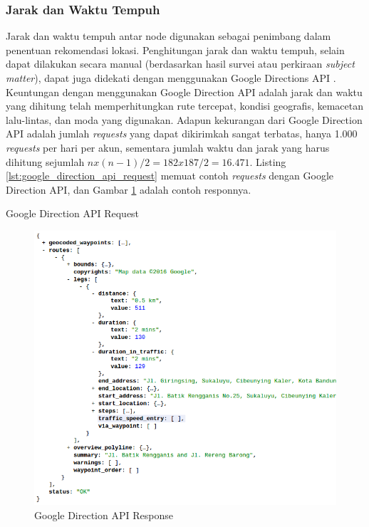 \subsubsection{Jarak dan Waktu Tempuh}

Jarak dan waktu tempuh antar node digunakan sebagai penimbang dalam penentuan rekomendasi lokasi. Penghitungan jarak dan waktu tempuh, selain dapat dilakukan secara manual (berdasarkan hasil survei atau perkiraan \textit{subject matter}), dapat juga didekati dengan menggunakan Google Directions API \citep{google_google_2016}. Keuntungan dengan menggunakan Google Direction API adalah jarak dan waktu yang dihitung telah memperhitungkan rute tercepat, kondisi geografis, kemacetan lalu-lintas, dan moda yang digunakan. Adapun kekurangan dari Google Direction API adalah jumlah \textit{requests} yang dapat dikirimkah sangat terbatas, hanya 1.000 \textit{requests} per hari per akun, sementara jumlah waktu dan jarak yang harus dihitung sejumlah $ nx(n-1)/2 = 182x187/2 = 16.471 $. Listing \ref{lst:google_direction_api_request} memuat contoh \textit{requests} dengan Google Direction API, dan Gambar \ref{fig:google_direction_api_response} adalah contoh responnya.


\begin{listing}
    \caption{Google Direction API Request}
    \label{lst:google_direction_api_request}
\end{listing}


\begin{figure}[h]
    \centering
    \includegraphics[width=\textwidth]{../../Resources/Images/google_direction_api_response}
    \caption{Google Direction API Response}
    \label{fig:google_direction_api_response}
\end{figure}


